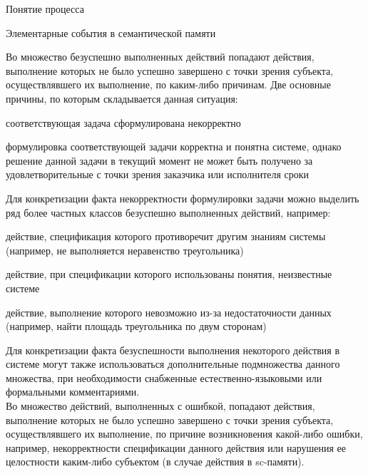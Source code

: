 \begin{frame}{\large Понятие процесса}
\begin{frame}{\large Элементарные события в семантической памяти}
\begin{frame}{}
Во множество безуспешно выполненных действий попадают действия, выполнение которых не было успешно завершено с точки зрения субъекта, осуществлявшего их выполнение, по каким-либо причинам.
Две основные причины, по которым складывается данная ситуация:
\begin{textitemize}
    \item соответствующая задача сформулирована некорректно
    \item формулировка соответствующей задачи корректна и понятна системе, однако решение данной задачи в текущий момент не может быть получено за удовлетворительные с точки зрения заказчика или исполнителя сроки
\end{textitemize}
\end{frame}
\begin{frame}{}
Для конкретизации факта некорректности формулировки задачи можно выделить ряд более частных классов безуспешно выполненных действий, например:
\begin{textitemize}
    \item действие, спецификация которого противоречит другим знаниям системы (например, не выполняется неравенство треугольника)
    \item действие, при спецификации которого использованы понятия, неизвестные системе
    \item действие, выполнение которого невозможно из-за недостаточности данных (например, найти площадь треугольника по двум сторонам)
\end{textitemize}
    Для конкретизации факта безуспешности выполнения некоторого действия в системе могут также использоваться дополнительные подмножества данного множества, при необходимости снабженные естественно-языковыми или формальными комментариями.\\
Во множество действий, выполненных с ошибкой, попадают действия, выполнение которых не было успешно завершено с точки зрения субъекта, осуществлявшего их выполнение, по причине возникновения какой-либо ошибки, например, некорректности спецификации данного действия или нарушения ее целостности каким-либо субъектом (в случае действия в sc-памяти).
\end{frame}


\end{frame}
\end{frame}
